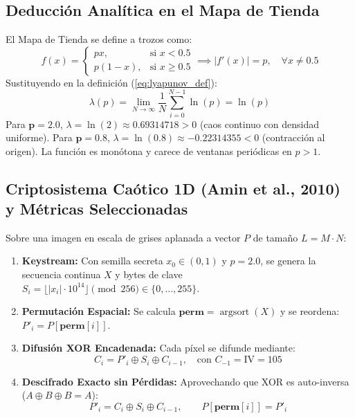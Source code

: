 \documentclass[11pt,letterpaper]{article}
\begin{document}
\subsection{Deducción Analítica en el Mapa de Tienda}
El Mapa de Tienda se define a trozos como:
\begin{equation}
    f(x) = \begin{cases} px, & \text{si } x < 0.5 \\ p(1 - x), & \text{si } x \ge 0.5 \end{cases} \implies |f'(x)| = p, \quad \forall x \neq 0.5
\end{equation}
Sustituyendo en la definición (\ref{eq:lyapunov_def}):
\begin{equation}
    \lambda(p) = \lim_{N \to \infty} \frac{1}{N} \sum_{i=0}^{N-1} \ln(p) = \ln(p)
    \label{eq:tent_analytic}
\end{equation}
Para $\boldsymbol{p = 2.0}$, $\lambda = \ln(2) \approx 0.69314718 > 0$ (caos continuo con densidad uniforme). Para $\boldsymbol{p = 0.8}$, $\lambda = \ln(0.8) \approx -0.22314355 < 0$ (contracción al origen). La función es monótona y carece de ventanas periódicas en $p > 1$.

\subsection{Criptosistema Caótico 1D (Amin et al., 2010) y Métricas Seleccionadas}
Sobre una imagen en escala de grises aplanada a vector $P$ de tamaño $L = M \cdot N$:
\begin{enumerate}
    \item \textbf{Keystream:} Con semilla secreta $x_0 \in (0, 1)$ y $p=2.0$, se genera la secuencia continua $X$ y bytes de clave $S_i = \lfloor |x_i| \cdot 10^{14} \rfloor \pmod{256} \in \{0, \dots, 255\}$.
    \item \textbf{Permutación Espacial:} Se calcula $\mathbf{perm} = \operatorname{argsort}(X)$ y se reordena: $P'_i = P[\mathbf{perm}[i]]$.
    \item \textbf{Difusión XOR Encadenada:} Cada píxel se difunde mediante:
    \begin{equation}
        C_i = P'_i \oplus S_i \oplus C_{i-1}, \quad \text{con } C_{-1} = \text{IV} = 105
    \end{equation}
    \item \textbf{Descifrado Exacto sin Pérdidas:} Aprovechando que XOR es auto-inversa ($A \oplus B \oplus B = A$):
    \begin{equation}
        P'_i = C_i \oplus S_i \oplus C_{i-1}, \qquad P[\mathbf{perm}[i]] = P'_i
    \end{equation}
\end{enumerate}
\end{document}
